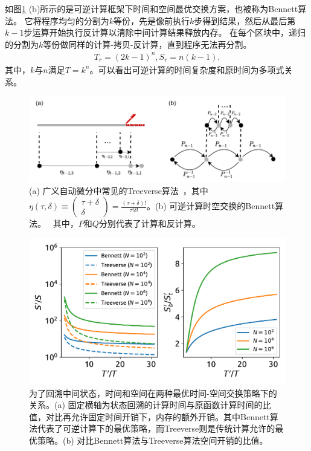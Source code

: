 \documentclass[A4,twoside,fontset=ubuntu,UTF8]{ctexart}
\begin{document}
如图\ref{fig:tradeoff} (b)所示的是可逆计算框架下时间和空间最优交换方案，也被称为Bennett算法。
它将程序均匀的分割为$k$等份，先是像前执行$k$步得到结果，然后从最后第$k-1$步运算开始执行反计算以清除中间计算结果释放内存。
在每个区块中，递归的分割为$k$等份做同样的计算-拷贝-反计算，直到程序无法再分割。
\begin{align}\label{eq:rev}
    T_r = (2k-1)^n, S_r = n(k-1).
\end{align}
其中，$k$与$n$满足$T = k^n$。可以看出可逆计算的时间复杂度和原时间为多项式关系。

\begin{figure}
    \centerline{\includegraphics[width=0.88\columnwidth,trim={0 0cm 0 0cm},clip]{tradeoff2.pdf}}
    \caption{(a) 广义自动微分中常见的Treeverse算法~\cite{Griewank1992}，其中$\eta(\tau, \delta) \equiv \left(\begin{matrix} \tau + \delta \\ \delta \end{matrix}\right)=\frac{(\tau+\delta)!}{\tau!\delta!}$。(b) 可逆计算时空交换的Bennett算法。~\cite{Bennett1973,Levine1990} 其中，$P$和$Q$分别代表了计算和反计算。}\label{fig:tradeoff}
\end{figure}

\begin{figure}[h]
\centering
\includegraphics[width=0.8\columnwidth]{./fig1.pdf}
    \caption{为了回溯中间状态，时间和空间在两种最优时间-空间交换策略下的关系。(a) 固定横轴为状态回溯的计算时间与原函数计算时间的比值，对比再允许固定时间开销下，内存的额外开销。其中Bennett算法代表了可逆计算下的最优策略，而Treeverse则是传统计算允许的最优策略。(b) 对比Bennett算法与Treeverse算法空间开销的比值。\label{fig:timespace}} 
\end{figure}
\end{document}
